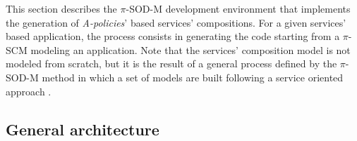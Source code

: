 
This section  describes the $\pi$-SOD-M development environment that implements the generation of {\em A-policies}' based services' compositions. For a given services' based application, the process  consists in generating the  code starting from a $\pi$-SCM modeling an application. Note that the services' composition model is not modeled from scratch, but it is the result of a general process defined by the $\pi$-SOD-M method in which a set of models are built following a service oriented approach \cite{decastro1}.


\subsection{General architecture}


